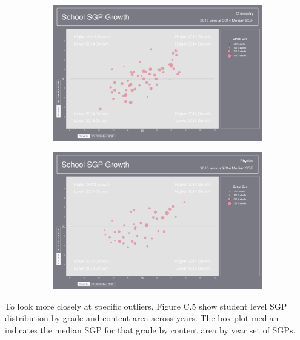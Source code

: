 \documentclass[12pt]{article}
\begin{document}
\begin{figure}[H]
  \begin{subfigure}[b]{\textwidth}
    \includegraphics[width=\textwidth]{../img/Appendices/Appendix_C/Bubble_Plots/School_2013_2014_CHEMISTRY_Growth.png}
  \end{subfigure}
  \begin{subfigure}[b]{\textwidth}
    \includegraphics[width=\textwidth]{../img/Appendices/Appendix_C/Bubble_Plots/School_2013_2014_PHYSICS_Growth.png}
  \end{subfigure}
\end{figure}

\pagebreak

To look more closely at specific outliers, Figure C.5 show student level
SGP distribution by grade and content area across years. The box plot
median indicates the median SGP for that grade by content area by year
set of SGPs.
\end{document}
